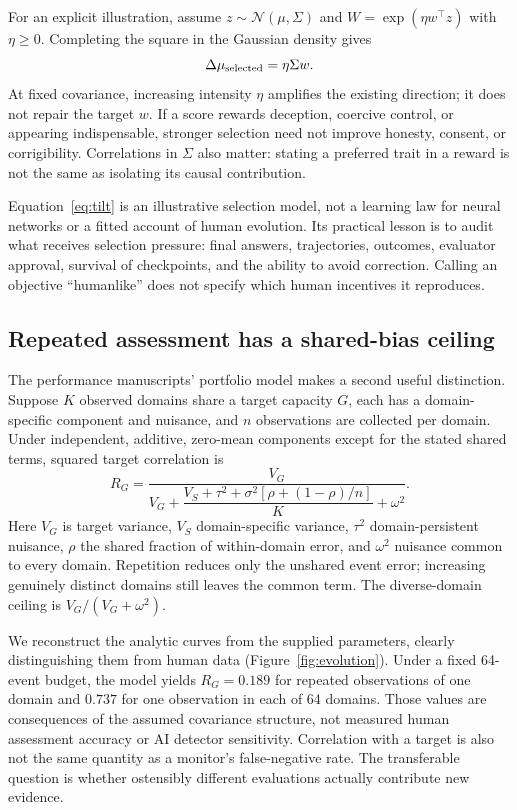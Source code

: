 \documentclass[10pt,twocolumn,letterpaper]{article}
\begin{document}
For an explicit illustration, assume $z\sim\mathcal N(\mu,\Sigma)$ and $W=\exp(\eta w^\top z)$ with $\eta\geq0$. Completing the square in the Gaussian density gives
\begin{equation}
\Delta\mu_{\rm selected}=\eta\Sigma w.
\label{eq:tilt}
\end{equation}
At fixed covariance, increasing intensity $\eta$ amplifies the existing direction; it does not repair the target $w$. If a score rewards deception, coercive control, or appearing indispensable, stronger selection need not improve honesty, consent, or corrigibility. Correlations in $\Sigma$ also matter: stating a preferred trait in a reward is not the same as isolating its causal contribution.

Equation~\eqref{eq:tilt} is an illustrative selection model, not a learning law for neural networks or a fitted account of human evolution. Its practical lesson is to audit what receives selection pressure: final answers, trajectories, outcomes, evaluator approval, survival of checkpoints, and the ability to avoid correction. Calling an objective ``humanlike'' does not specify which human incentives it reproduces.

\subsection{Repeated assessment has a shared-bias ceiling}
The performance manuscripts' portfolio model makes a second useful distinction. Suppose $K$ observed domains share a target capacity $G$, each has a domain-specific component and nuisance, and $n$ observations are collected per domain. Under independent, additive, zero-mean components except for the stated shared terms, squared target correlation is
\begin{equation}
R_G=\frac{V_G}{V_G+\dfrac{V_S+\tau^2+\sigma^2[\rho+(1-\rho)/n]}{K}+\omega^2}.
\label{eq:portfolio}
\end{equation}
Here $V_G$ is target variance, $V_S$ domain-specific variance, $\tau^2$ domain-persistent nuisance, $\rho$ the shared fraction of within-domain error, and $\omega^2$ nuisance common to every domain. Repetition reduces only the unshared event error; increasing genuinely distinct domains still leaves the common term. The diverse-domain ceiling is $V_G/(V_G+\omega^2)$.

We reconstruct the analytic curves from the supplied parameters, clearly distinguishing them from human data (Figure~\ref{fig:evolution}). Under a fixed 64-event budget, the model yields $R_G=0.189$ for repeated observations of one domain and $0.737$ for one observation in each of 64 domains. Those values are consequences of the assumed covariance structure, not measured human assessment accuracy or AI detector sensitivity. Correlation with a target is also not the same quantity as a monitor's false-negative rate. The transferable question is whether ostensibly different evaluations actually contribute new evidence.
\end{document}

